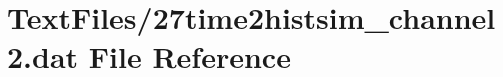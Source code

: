 \hypertarget{27time2histsim__channel2_8dat}{}\section{Text\+Files/27time2histsim\+\_\+channel2.dat File Reference}
\label{27time2histsim__channel2_8dat}
